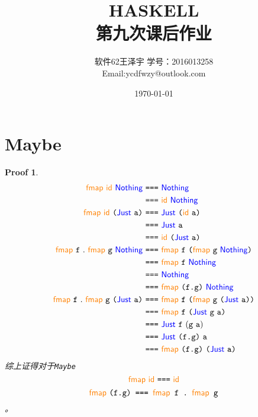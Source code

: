 \documentclass[UTF8]{article}
\title{HASKELL \\ \Large{第九次课后作业}}
\author{软件62王泽宇 \qquad 学号：2016013258 \\ Email:ycdfwzy@outlook.com}
\date{\today}
\newtheorem{Proof}{Proof}
\let\t\texttt
\newcommand{\kword}[1]{{\color{blue} \textsf{#1}}}
\newcommand{\func}[1]{{\color{orange} \textsf{#1}}}
\newcommand{\Nothing}{\kword{Nothing}}
\newcommand{\Just}{\kword{Just}}
\newcommand{\id}{\func{id}}
\newcommand{\fmap}{\func{fmap}}
\newcommand{\eq}{\t{===}}
\newcommand{\lb}{\t{(}}
\newcommand{\rb}{\t{)}}
\begin{document}
\maketitle
\section{Maybe}
    \begin{Proof}
        \begin{align}
            \fmap~\id~\Nothing~&\eq~\Nothing \notag \\
            &\eq~\id~\Nothing  \notag \\
            \fmap~\id~\lb\Just~\t{a}\rb~&\eq~\Just~\lb\id~\t{a}\rb \notag \\
            &\eq~\Just~\t{a} \notag \\
            &\eq~\id~\lb\Just~\t{a}\rb \notag \\
            \fmap~\t{f}~.~\fmap~\t{g}~\Nothing~&\eq~\fmap~\t{f}~\lb\fmap~\t{g}~\Nothing\rb \notag \\
            &\eq~\fmap~\t{f}~\Nothing \notag \\
            &\eq~\Nothing \notag \\
            &\eq~\fmap~\t{(f.g)}~\Nothing \notag \\
            \fmap~\t{f}~.~\fmap~\t{g}~\lb\Just~\t{a}\rb~&\eq~\fmap~\t{f}~\lb\fmap~\t{g}~\lb\Just~\t{a}\rb\rb \notag \\
            &\eq~\fmap~\t{f}~\lb\Just~\t{g}~\t{a}\rb \notag \\
            &\eq~\Just~\t{f}~(\t{g}~\t{a}) \notag \\
            &\eq~\Just~\t{(f.g)}~\t{a} \notag \\
            &\eq~\fmap~\t{(f.g)}~\lb\Just~\t{a}\rb \notag
        \end{align}
        综上证得对于\texttt{Maybe} $$\fmap~\id~\eq~\id$$ $$\fmap~\t{(f.g)~\eq~\fmap~\t{f}~.~\fmap~\t{g}}$$。
    \end{Proof}
\end{document}
